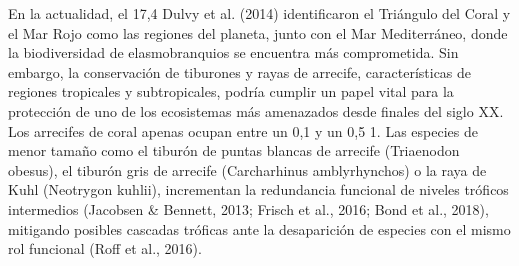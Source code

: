 \documentclass[a4paper, 11pt]{article}
\begin{document}
En la actualidad, el 17,4%
Dulvy et al. (2014) identificaron el Triángulo del Coral y el Mar Rojo como las regiones del planeta, junto con el Mar Mediterráneo, donde la biodiversidad de elasmobranquios se encuentra más comprometida. Sin embargo, la conservación de tiburones y rayas de arrecife, características de regiones tropicales y subtropicales, podría cumplir un papel vital para la protección de uno de los ecosistemas más amenazados desde finales del siglo XX. Los arrecifes de coral apenas ocupan entre un 0,1 y un 0,5%
1.	Las especies de menor tamaño como el tiburón de puntas blancas de arrecife (Triaenodon obesus), el tiburón gris de arrecife (Carcharhinus amblyrhynchos) o la raya de Kuhl (Neotrygon kuhlii), incrementan la redundancia funcional de niveles tróficos intermedios (Jacobsen & Bennett, 2013; Frisch et al., 2016; Bond et al., 2018), mitigando posibles cascadas tróficas ante la desaparición de especies con el mismo rol funcional (Roff et al., 2016). 
\end{document}
